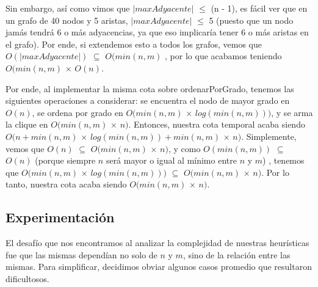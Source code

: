 Sin embargo, así como vimos que $|maxAdyacente|$ $\leq$ (n - 1), es fácil ver que en un grafo de 40 nodos y 5 aristas, $|maxAdyacente|$ $\leq$ 5 (puesto que un nodo jamás tendrá 6 o más adyacencias, ya que eso implicaría tener 6 o más aristas en el grafo). Por ende, si extendemos esto a todos los grafos, vemos que $O(|maxAdyacente|)$ $\subseteq$ $O(min(n,m)$ , por lo que acabamos teniendo $O(min(n,m)$ $\times$ $O(n)$.

Por ende, al implementar la misma cota sobre ordenarPorGrado, tenemos las siguientes operaciones a considerar: se encuentra el nodo de mayor grado en $O(n)$, se ordena por grado en $O(min(n,m)$ $\times$ $log(min(n,m)))$, y se arma la clique en $O(min(n,m)$ $\times$ $n )$.  Entonces, nuestra cota temporal acaba siendo $O(n + min(n,m)$ $\times$ $log(min(n,m)) + min(n,m)$ $\times$ $n )$. Simplemente, vemos que $O(n)$ $\subseteq$ $O(min(n,m)$ $\times$ $n )$, y como $O(min(n,m))$ $\subseteq$ $O(n)$ (porque siempre $n$ será mayor o igual al mínimo entre $n$ y $m$) , tenemos que $O(min(n,m)$ $\times$ $log(min(n,m)))$ $\subseteq$ $O(min(n,m)$ $\times$ $n )$. Por lo tanto, nuestra cota acaba siendo $O(min(n,m)$ $\times$ $n )$.


\subsection{Experimentación}

El desafío que nos encontramos al analizar la complejidad de nuestras heurísticas fue que las mismas dependían no solo de $n$ y $m$, sino de la relación entre las mismas. Para simplificar, decidimos obviar algunos casos promedio que resultaron dificultosos.

